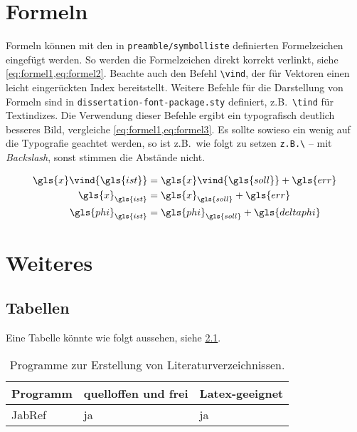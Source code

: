 
\chapter{Formeln} \label{sec:Formeln}

Formeln können mit den in \texttt{preamble/symbolliste} definierten Formelzeichen eingefügt werden. So werden die Formelzeichen direkt korrekt verlinkt, siehe \cref{eq:formel1,eq:formel2}. Beachte auch den Befehl \texttt{\textbackslash vind}, der für Vektoren einen leicht eingerückten Index bereitstellt. Weitere Befehle für die Darstellung von Formeln sind in \texttt{dissertation-font-package.sty} definiert, z.B.\ \texttt{\textbackslash tind} für Textindizes. Die Verwendung dieser Befehle ergibt ein typografisch deutlich besseres Bild, vergleiche \cref{eq:formel1,eq:formel3}. Es sollte sowieso ein wenig auf die Typografie geachtet werden, so ist z.B.\ wie folgt zu setzen \texttt{z.B.\textbackslash} -- mit \textit{Backslash}, sonst stimmen die Abstände nicht.

\begin{align}
	\label{eq:formel1}
	\gls{x}\vind{\gls{ist}} & = \gls{x}\vind{\gls{soll}} + \gls{err}    \\
	\label{eq:formel3}
	\gls{x}_{\gls{ist}}     & = \gls{x}_{\gls{soll}} + \gls{err}        \\
	\label{eq:formel2}
	\gls{phi}_{\gls{ist}}   & = \gls{phi}_{\gls{soll}} + \gls{deltaphi}
\end{align}

\blindtext[3]


\chapter{Weiteres}

\section{Tabellen}
\label{sec:HFS_Wahrnehmung}

Eine Tabelle könnte wie folgt aussehen, siehe \cref{tab:programme}.

\begin{table}[hbt]
	\centering
	\caption{Programme zur Erstellung von Literaturverzeichnissen.}
	\label{tab:programme}
	\begin{tabular}{lll}
		\toprule
		Programm & quelloffen und frei & Latex-geeignet \\ \midrule
		JabRef   & ja                  & ja             \\ \bottomrule
	\end{tabular}
\end{table}

